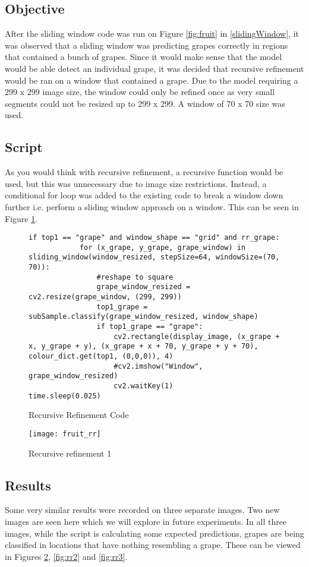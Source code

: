 \tocless\subsection{Objective}
After the sliding window code was run on Figure \ref{fig:fruit} in \ref{slidingWindow},
it was observed that a sliding window was predicting grapes correctly in
regions that contained a bunch of grapes. Since it would make sense that the
model would be able detect an individual grape, it was decided that
recursive refinement would be ran on a window that contained a grape. Due to the model
requiring a 299 x 299 image size, the window could only be refined once as
very small segments could not be resized up to 299 x 299. A window of 70 x 70 size was used.

\tocless\subsection{Script}
As you would think with recursive refinement, a recursive function would be used,
but this was unnecessary due to image size restrictions. Instead, a
conditional for loop was added to the existing code to break a window down further i.e. perform a sliding window approach on a window.
This can be seen in Figure \ref{lst:rrCode}.

\begin{figure}[h]
\caption{Recursive Refinement Code}
\label{lst:rrCode}
\begin{lstlisting}[style=Python]
if top1 == "grape" and window_shape == "grid" and rr_grape:
			for (x_grape, y_grape, grape_window) in sliding_window(window_resized, stepSize=64, windowSize=(70, 70)):
				#reshape to square
				grape_window_resized = cv2.resize(grape_window, (299, 299))
				top1_grape = subSample.classify(grape_window_resized, window_shape)
				if top1_grape == "grape":
					cv2.rectangle(display_image, (x_grape + x, y_grape + y), (x_grape + x + 70, y_grape + y + 70), colour_dict.get(top1, (0,0,0)), 4)
					#cv2.imshow("Window", grape_window_resized)
					cv2.waitKey(1)
time.sleep(0.025)
\end{lstlisting}
\end{figure}

\begin{figure}[h]
\centering
    \texttt{[image: fruit\_rr]}
      \caption{Recursive refinement 1}
      \label{fig:rr1}
\end{figure}

\tocless\subsection{Results}
Some very similar results were recorded on three separate images. Two new images are seen
here which we will explore in future experiments. In all three images, while the script
is calculating some expected predictions, grapes are being classified in locations
that have nothing resembling a grape. These can be viewed in Figures
\ref{fig:rr1}, \ref{fig:rr2} and \ref{fig:rr3}.

